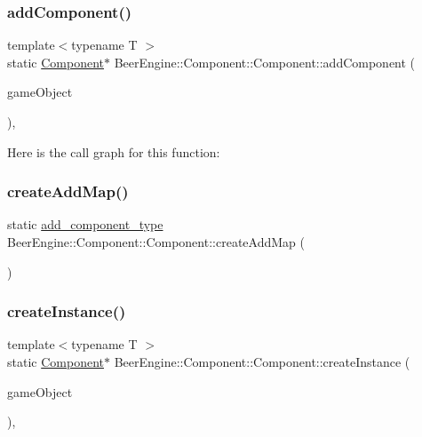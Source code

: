 \subsubsection{\texorpdfstring{add\+Component()}{addComponent()}}
{\footnotesize\ttfamily template$<$typename T $>$ \\
static \mbox{\hyperlink{class_beer_engine_1_1_component_1_1_component}{Component}}$\ast$ Beer\+Engine\+::\+Component\+::\+Component\+::add\+Component (\begin{DoxyParamCaption}\item[{\mbox{\hyperlink{class_beer_engine_1_1_game_object}{Game\+Object}} $\ast$}]{game\+Object }\end{DoxyParamCaption})\hspace{0.3cm}{\ttfamily [inline]}, {\ttfamily [static]}}

Here is the call graph for this function\+:
\mbox{\label{class_beer_engine_1_1_component_1_1_component_a646c01f1d1d951e58431a80f68778b84}} 
\subsubsection{\texorpdfstring{create\+Add\+Map()}{createAddMap()}}
{\footnotesize\ttfamily static \mbox{\hyperlink{namespace_beer_engine_1_1_component_a58109916ff3e951c90c1dcd5ebba359b}{add\+\_\+component\+\_\+type}} Beer\+Engine\+::\+Component\+::\+Component\+::create\+Add\+Map (\begin{DoxyParamCaption}{ }\end{DoxyParamCaption})\hspace{0.3cm}{\ttfamily [static]}}

\mbox{\label{class_beer_engine_1_1_component_1_1_component_ab76c60b461751c67f4110ecb32f94b6b}} 
\subsubsection{\texorpdfstring{create\+Instance()}{createInstance()}}
{\footnotesize\ttfamily template$<$typename T $>$ \\
static \mbox{\hyperlink{class_beer_engine_1_1_component_1_1_component}{Component}}$\ast$ Beer\+Engine\+::\+Component\+::\+Component\+::create\+Instance (\begin{DoxyParamCaption}\item[{\mbox{\hyperlink{class_beer_engine_1_1_game_object}{Game\+Object}} $\ast$}]{game\+Object }\end{DoxyParamCaption})\hspace{0.3cm}{\ttfamily [inline]}, {\ttfamily [static]}}

